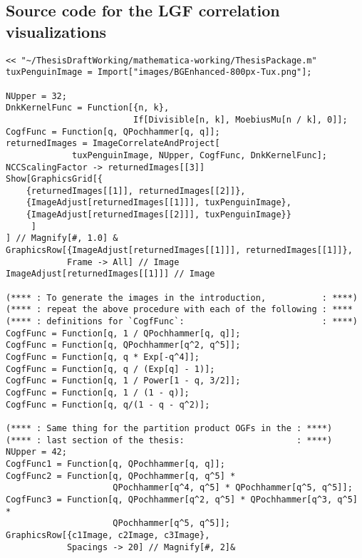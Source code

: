 \documentclass[12pt,reqno,a4letter]{article}
\numberwithin{figure}{section}
\numberwithin{table}{section}
\numberwithin{equation}{section}
\theoremstyle{plain}
\numberwithin{theorem}{section}
\theoremstyle{definition}
\begin{document}
\subsection{Source code for the LGF correlation visualizations}


\begin{lstlisting}[caption={Mathematica notebook code for the LGF correlation visualizations}]
<< "~/ThesisDraftWorking/mathematica-working/ThesisPackage.m"
tuxPenguinImage = Import["images/BGEnhanced-800px-Tux.png"];

NUpper = 32;
DnkKernelFunc = Function[{n, k}, 
                         If[Divisible[n, k], MoebiusMu[n / k], 0]];
CogfFunc = Function[q, QPochhammer[q, q]];
returnedImages = ImageCorrelateAndProject[
	         tuxPenguinImage, NUpper, CogfFunc, DnkKernelFunc];
NCCScalingFactor -> returnedImages[[3]]
Show[GraphicsGrid[{
	{returnedImages[[1]], returnedImages[[2]]}, 
	{ImageAdjust[returnedImages[[1]]], tuxPenguinImage}, 
	{ImageAdjust[returnedImages[[2]]], tuxPenguinImage}}
     ]
] // Magnify[#, 1.0] &
GraphicsRow[{ImageAdjust[returnedImages[[1]]], returnedImages[[1]]}, 
            Frame -> All] // Image
ImageAdjust[returnedImages[[1]]] // Image

(**** : To generate the images in the introduction,           : ****)
(**** : repeat the above procedure with each of the following : ****
(**** : definitions for `CogfFunc`:                           : ****)
CogfFunc = Function[q, 1 / QPochhammer[q, q]];
CogfFunc = Function[q, QPochhammer[q^2, q^5]];
CogfFunc = Function[q, q * Exp[-q^4]];
CogfFunc = Function[q, q / (Exp[q] - 1)];
CogfFunc = Function[q, 1 / Power[1 - q, 3/2]];
CogfFunc = Function[q, 1 / (1 - q)];
CogfFunc = Function[q, q/(1 - q - q^2)];

(**** : Same thing for the partition product OGFs in the : ****)
(**** : last section of the thesis:                      : ****)
NUpper = 42;
CogfFunc1 = Function[q, QPochhammer[q, q]];
CogfFunc2 = Function[q, QPochhammer[q, q^5] * 
                     QPochhammer[q^4, q^5] * QPochhammer[q^5, q^5]];
CogfFunc3 = Function[q, QPochhammer[q^2, q^5] * QPochhammer[q^3, q^5] * 
                     QPochhammer[q^5, q^5]];
GraphicsRow[{c1Image, c2Image, c3Image}, 
            Spacings -> 20] // Magnify[#, 2]&
\end{lstlisting}
\end{document}
